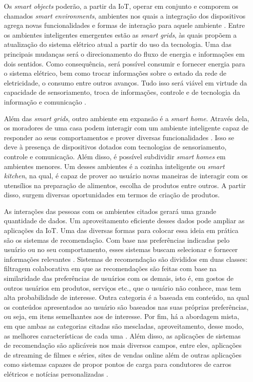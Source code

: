 Os \textit{smart objects} poderão, a partir da IoT, operar em conjunto e comporem os chamados \textit{smart environments}, ambientes nos quais a integração dos dispositivos agrega novas funcionalidades e formas de interação para aquele ambiente \cite{Asano2016}. Entre os ambientes inteligentes emergentes estão as \textit{smart grids}, às quais propõem a atualização do sistema elétrico atual a partir do uso da tecnologia. Uma das principais mudanças será o direcionamento do fluxo de energia e informações em dois sentidos. Como consequência, será possível consumir e fornecer energia para o sistema elétrico, bem como trocar informações sobre o estado da rede de eletricidade, o consumo entre outros avanços. Tudo isso será viável em virtude da capacidade de sensoriamento, troca de informações, controle e de tecnologia da informação e comunicação \cite{Cecilia2016}.  

Além das \textit{smart grids}, outro ambiente em expansão é a \textit{smart home}. Através dela, os moradores de uma casa podem interagir com um ambiente inteligente capaz de responder ao seus comportamentos e prover diversas funcionalidades \cite{Silva2012}. Isso se deve  à presença de dispositivos dotados com tecnologias de sensoriamento, controle e comunicação. Além disso, é possível subdividir \textit{smart homes} em ambientes menores. Um desses ambientes é a cozinha inteligente ou \textit{smart kitchen}, na qual, é capaz de prover ao usuário novas maneiras de interagir com os utensílios na preparação de alimentos, escolha de produtos entre outros. A partir disso, surgem diversas oportunidades em termos de criação de produtos.


As interações das pessoas com os ambientes citados gerará uma grande quantidade de dados. Um aproveitamento eficiente desses dados pode ampliar as aplicações da IoT.
Uma das diversas formas para colocar essa ideia em prática são os sistemas de recomendação. Com base nas preferências indicadas pelo usuário ou no seu comportamento, esses sistemas buscam selecionar e fornecer informações relevantes \cite{Filho2008}.
Sistemas de recomendação são divididos em duas classes: filtragem colaborativa em que as recomendações são feitas com base na similaridade das preferências de usuários com os demais, isto é, em gostos de outros usuários em produtos, serviços etc., que o usuário não conhece, mas tem alta probabilidade de interesse. Outra categoria é a baseada em conteúdo, na qual os conteúdos apresentados ao usuário são baseados nas suas próprias preferências, ou seja, em itens semelhantes aos de interesse. Por fim, há a abordagem mista, em que ambas as categorias citadas são mescladas, aproveitamento, desse modo, as melhores características de cada uma \cite{Thomas2016}.
Além disso, as aplicações de sistemas de recomendação são aplicáveis nos mais diversos campos, entre eles, aplicações de streaming de filmes e séries, sites de vendas online além de outras aplicações como sistemas capazes de propor pontos de carga para condutores de carros elétricos \cite{Ferreira2011} e notícias personalizadas \cite{Yeung2010}.

